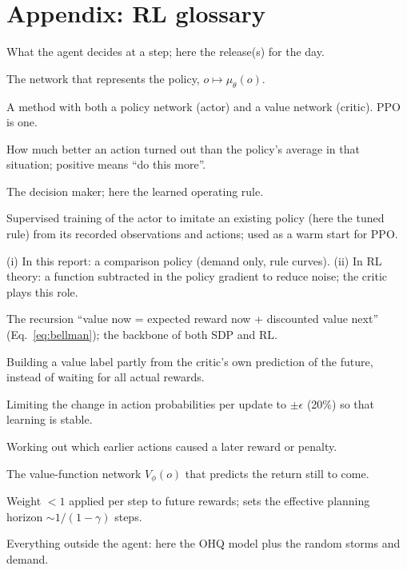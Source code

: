\section*{Appendix: RL glossary}
\begin{description}\itemsep2pt\small
\item[Action ($a_t$)] What the agent decides at a step; here the release(s) for the day.
\item[Actor] The network that represents the policy, $o\mapsto\mu_\theta(o)$.
\item[Actor--critic] A method with both a policy network (actor) and a value network (critic). PPO is one.
\item[Advantage ($A$, $\hat A_t$)] How much better an action turned out than the policy's average in that situation; positive means ``do this more''.
\item[Agent] The decision maker; here the learned operating rule.
\item[Behavior cloning] Supervised training of the actor to imitate an existing policy (here the tuned rule) from its recorded observations and actions; used as a warm start for PPO.
\item[Baseline] (i) In this report: a comparison policy (demand only, rule curves). (ii) In RL theory: a function subtracted in the policy gradient to reduce noise; the critic plays this role.
\item[Bellman equation] The recursion ``value now = expected reward now + discounted value next'' (Eq.~\ref{eq:bellman}); the backbone of both SDP and RL.
\item[Bootstrapping] Building a value label partly from the critic's own prediction of the future, instead of waiting for all actual rewards.
\item[Clipping (PPO)] Limiting the change in action probabilities per update to $\pm\epsilon$ (20\%) so that learning is stable.
\item[Credit assignment] Working out which earlier actions caused a later reward or penalty.
\item[Critic] The value-function network $V_\phi(o)$ that predicts the return still to come.
\item[Discount factor ($\gamma$)] Weight $<1$ applied per step to future rewards; sets the effective planning horizon $\sim1/(1-\gamma)$ steps.
\item[Environment] Everything outside the agent: here the OHQ model plus the random storms and demand.

\end{description}
